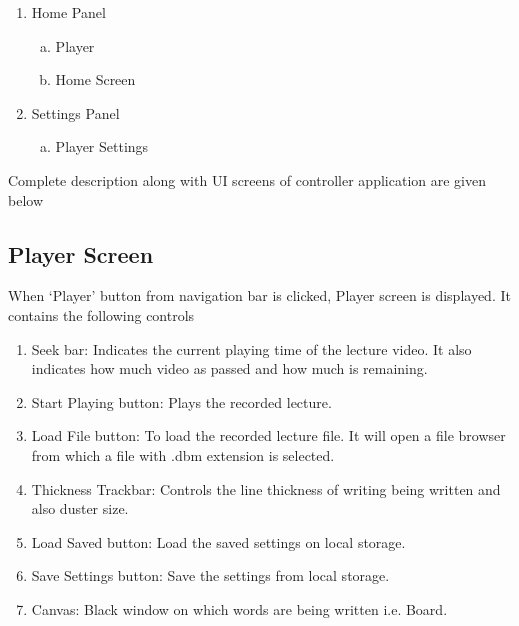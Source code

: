 \begin{enumerate}

\item Home Panel
\begin{enumerate}[a.]

\item Player
\item Home Screen

\end{enumerate}


\item Settings Panel
\begin{enumerate}[a.]

\item Player Settings

\end{enumerate}

\end{enumerate}

Complete description along with UI screens of controller application are given below

\subsection{Player Screen}
When ‘Player’ button from navigation bar is clicked, Player screen is displayed. It contains the following controls

\begin{enumerate}

\item Seek bar: Indicates the current playing time of the lecture video. It also indicates how much video as passed and how much is remaining.
\item Start Playing button: Plays the recorded lecture.
\item Load File button: To load the recorded lecture file. It will open a file browser from which a file with .dbm extension is selected.
\item Thickness Trackbar: Controls the line thickness of writing being written and also duster size.
\item Load Saved button: Load the saved settings on local storage.
\item Save Settings button: Save the settings from local storage.
\item Canvas: Black window on which words are being written i.e. Board.

\end{enumerate}

